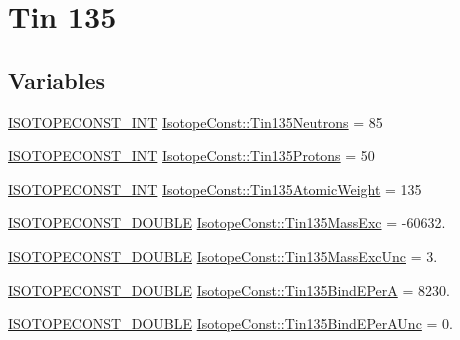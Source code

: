 \hypertarget{group___isotope_const-_tin-_sn135}{}\section{Tin 135}
\label{group___isotope_const-_tin-_sn135}
\subsection*{Variables}
\begin{DoxyCompactItemize}
\item 
\mbox{\hyperlink{group___isotope_const-_macros_ga5f18360b3e99483a35c32d789e62621c}{I\+S\+O\+T\+O\+P\+E\+C\+O\+N\+S\+T\+\_\+\+I\+NT}} \mbox{\hyperlink{group___isotope_const-_tin-_sn135_ga87053cd1a2e67c27753febc1a8b125a9}{Isotope\+Const\+::\+Tin135\+Neutrons}} = 85
\item 
\mbox{\hyperlink{group___isotope_const-_macros_ga5f18360b3e99483a35c32d789e62621c}{I\+S\+O\+T\+O\+P\+E\+C\+O\+N\+S\+T\+\_\+\+I\+NT}} \mbox{\hyperlink{group___isotope_const-_tin-_sn135_gad28fd873af7cd135cfcdacec1f900479}{Isotope\+Const\+::\+Tin135\+Protons}} = 50
\item 
\mbox{\hyperlink{group___isotope_const-_macros_ga5f18360b3e99483a35c32d789e62621c}{I\+S\+O\+T\+O\+P\+E\+C\+O\+N\+S\+T\+\_\+\+I\+NT}} \mbox{\hyperlink{group___isotope_const-_tin-_sn135_ga724a305cda9f7602a242c066bd501afd}{Isotope\+Const\+::\+Tin135\+Atomic\+Weight}} = 135
\item 
\mbox{\hyperlink{group___isotope_const-_macros_ga8f45a7272ce02c0b4c65c44636ed719a}{I\+S\+O\+T\+O\+P\+E\+C\+O\+N\+S\+T\+\_\+\+D\+O\+U\+B\+LE}} \mbox{\hyperlink{group___isotope_const-_tin-_sn135_gadf76fa057672261f3ad218fead3a0765}{Isotope\+Const\+::\+Tin135\+Mass\+Exc}} = -\/60632.
\item 
\mbox{\hyperlink{group___isotope_const-_macros_ga8f45a7272ce02c0b4c65c44636ed719a}{I\+S\+O\+T\+O\+P\+E\+C\+O\+N\+S\+T\+\_\+\+D\+O\+U\+B\+LE}} \mbox{\hyperlink{group___isotope_const-_tin-_sn135_gac9371b0d0423e3fd37832b329c1fc3b5}{Isotope\+Const\+::\+Tin135\+Mass\+Exc\+Unc}} = 3.
\item 
\mbox{\hyperlink{group___isotope_const-_macros_ga8f45a7272ce02c0b4c65c44636ed719a}{I\+S\+O\+T\+O\+P\+E\+C\+O\+N\+S\+T\+\_\+\+D\+O\+U\+B\+LE}} \mbox{\hyperlink{group___isotope_const-_tin-_sn135_ga97786641d5f2c59c05d5476e6db009b7}{Isotope\+Const\+::\+Tin135\+Bind\+E\+PerA}} = 8230.
\item 
\mbox{\hyperlink{group___isotope_const-_macros_ga8f45a7272ce02c0b4c65c44636ed719a}{I\+S\+O\+T\+O\+P\+E\+C\+O\+N\+S\+T\+\_\+\+D\+O\+U\+B\+LE}} \mbox{\hyperlink{group___isotope_const-_tin-_sn135_ga66aae9a7890b3144393ab49219ad7a1d}{Isotope\+Const\+::\+Tin135\+Bind\+E\+Per\+A\+Unc}} = 0.

\end{DoxyCompactItemize}

